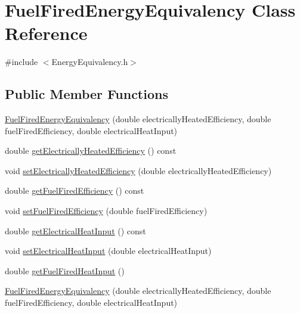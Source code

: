 \hypertarget{class_fuel_fired_energy_equivalency}{}\section{Fuel\+Fired\+Energy\+Equivalency Class Reference}
\label{class_fuel_fired_energy_equivalency}


{\ttfamily \#include $<$Energy\+Equivalency.\+h$>$}

\subsection*{Public Member Functions}
\begin{DoxyCompactItemize}
\item 
\hyperlink{class_fuel_fired_energy_equivalency_ac4ba992ccb3d4a19eb29f14898031690}{Fuel\+Fired\+Energy\+Equivalency} (double electrically\+Heated\+Efficiency, double fuel\+Fired\+Efficiency, double electrical\+Heat\+Input)
\item 
double \hyperlink{class_fuel_fired_energy_equivalency_ad4bd750677313895d8345c7eaf8308bd}{get\+Electrically\+Heated\+Efficiency} () const
\item 
void \hyperlink{class_fuel_fired_energy_equivalency_a2e8e166d9824ee07805cd790eff5e361}{set\+Electrically\+Heated\+Efficiency} (double electrically\+Heated\+Efficiency)
\item 
double \hyperlink{class_fuel_fired_energy_equivalency_ac8695c1fe3dcffeab60b5305239d2a58}{get\+Fuel\+Fired\+Efficiency} () const
\item 
void \hyperlink{class_fuel_fired_energy_equivalency_a510b4a7c1231faeeebca02fa0b1723ae}{set\+Fuel\+Fired\+Efficiency} (double fuel\+Fired\+Efficiency)
\item 
double \hyperlink{class_fuel_fired_energy_equivalency_a7d5878809c01a9243aa999406cddd4a9}{get\+Electrical\+Heat\+Input} () const
\item 
void \hyperlink{class_fuel_fired_energy_equivalency_a222836bfef1cb0caec0adafc2ef6b7ea}{set\+Electrical\+Heat\+Input} (double electrical\+Heat\+Input)
\item 
double \hyperlink{class_fuel_fired_energy_equivalency_a6bf68595ca361dd4135d0c84c2fbe6d9}{get\+Fuel\+Fired\+Heat\+Input} ()
\item 
\hyperlink{class_fuel_fired_energy_equivalency_ac4ba992ccb3d4a19eb29f14898031690}{Fuel\+Fired\+Energy\+Equivalency} (double electrically\+Heated\+Efficiency, double fuel\+Fired\+Efficiency, double electrical\+Heat\+Input)

\end{DoxyCompactItemize}
